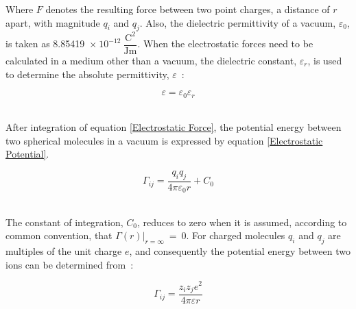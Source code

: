 
Where $F$ denotes the resulting force between two point charges, a distance of $r$ apart, with magnitude $q_{i}$ and $q_{j}$. Also, the dielectric permittivity of a vacuum, $\varepsilon_{0}$, is taken as 8.85419~$\mathrm{\times~10^{-12}~\dfrac{C^{2}}{Jm}}$. When the electrostatic forces need to be calculated in a medium other than a vacuum, the dielectric constant, $\varepsilon_{r}$, is used to determine the absolute permittivity, $\varepsilon$~\cite{MolecularThermodynamicsOfFluidPhaseEquilibria}:\

\begin{equation}
\varepsilon = \varepsilon_{0} \varepsilon_{r}
\end{equation}\


After integration of equation \ref{Electrostatic Force}, the potential energy between two spherical molecules in a vacuum is expressed by equation \ref{Electrostatic Potential}.\

\begin{equation}
\Gamma_{ij} = \frac{q_{i}q_{j}}{4 \pi \varepsilon_{0} r} + C_{0} \label{Electrostatic Potential}
\end{equation}\


The constant of integration, $C_{0}$, reduces to zero when it is assumed, according to common convention, that $\Gamma\left(r\right)\vert_{r =\infty}~=~0$. For charged molecules $q_{i}$ and $q_{j}$ are multiples of the unit charge $\mathit{e}$, and consequently  the potential energy between two ions can be determined from~\cite{MolecularThermodynamicsOfFluidPhaseEquilibria}:\

\begin{equation}
\Gamma_{ij} = \frac{z_{i}z_{j}\mathit{e}^{2}}{4 \pi \varepsilon r}
\end{equation}\


